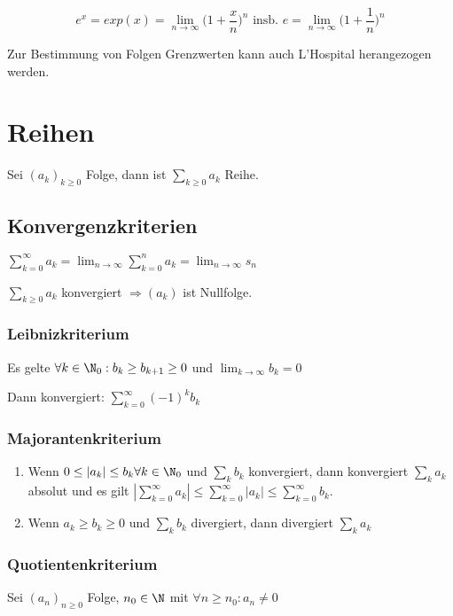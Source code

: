 $$e^x = exp(x) = \lim_{n\to \infty} \Big(1 + \frac{x}{n}\Big)^n \text{ insb. } e = \lim_{n\to \infty} \Big(1 + \frac{1}{n}\Big)^n$$

Zur Bestimmung von Folgen Grenzwerten kann auch L'Hospital herangezogen werden.

\section*{Reihen}

Sei $(a_k)_{k\geq 0}$ Folge, dann ist $\sum_{k\geq 0} a_k$ Reihe.

\subsection*{Konvergenzkriterien}

$\sum_{k=0}^\infty a_k = \lim_{n\to \infty} \sum_{k=0}^n a_k = \lim_{n\to \infty} s_n$

$\sum_{k\geq 0} a_k$ konvergiert $\Rightarrow (a_k)$ ist Nullfolge.

\subsubsection*{Leibnizkriterium}

Es gelte $\forall k \in \N_0 : b_k \geq b_{k+1} \geq 0$ und $\displaystyle \lim_{k \to \infty} b_k = 0$

Dann konvergiert: $\sum_{k=0}^\infty (-1)^k b_k$

\subsubsection*{Majorantenkriterium}

\begin{enumerate}[label=(\alph*)]
	\item Wenn $0 \leq |a_k| \leq b_k \forall k \in \N_0$ und $\sum_k b_k$ konvergiert, dann konvergiert $\sum_k a_k$ absolut und es gilt $|\sum_{k=0}^\infty a_k| \leq \sum_{k=0}^\infty |a_k| \leq \sum_{k=0}^\infty b_k$.
	\item Wenn $a_k \geq b_k \geq 0$ und $\sum_k b_k$ divergiert, dann divergiert $\sum_k a_k$
\end{enumerate}

\subsubsection*{Quotientenkriterium}

Sei $(a_n)_{n\geq 0}$ Folge, $n_0 \in \N$ mit $\forall n \geq n_0 : a_n \neq 0$

